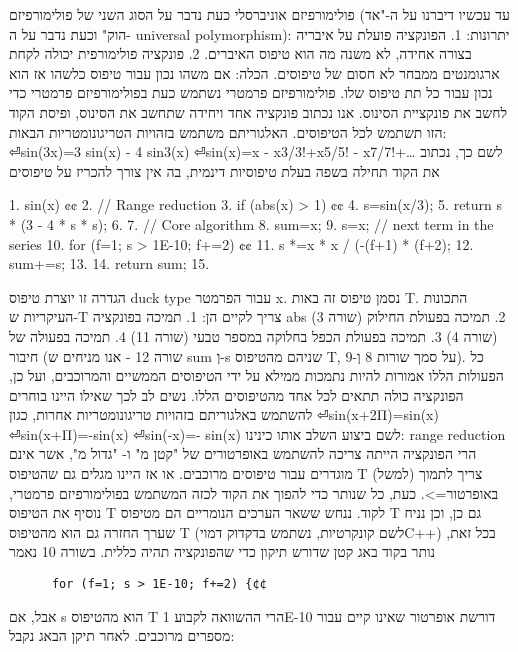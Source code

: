 \begin{טבלא}[!htbp]
      פולימורפיזם אוניברסלי
      כעת נדבר על הסוג השני של פולימורפיזם (עד עכשיו דיברנו על ה-"אד הוק" וכעת נדבר על ה- universal polymorphism):
      יתרונות:
      1. הפונקציה פועלת על איבריה בצורה אחידה, לא משנה מה הוא טיפוס האיברים.
      2. פונקציה פולימורפית יכולה לקחת ארגומנטים ממבחר לא חסום של טיפוסים.
      הכלה:
      אם משהו נכון עבור טיפוס כלשהו אז הוא נכון עבור כל תת טיפוס שלו.
      פולימורפיזם פרמטרי
      נשתמש כעת בפולימורפיזם פרמטרי כדי לחשב את פונקציית הסינוס. אנו נכתוב פונקציה אחד ויחידה שתחשב את הסינוס, ופיסת הקוד הזו תשתמש לכל הטיפוסים. האלגוריתם משתמש בזהויות הטריגונומטריות הבאות:
⏎sin(3x)=3 sin(x) - 4 sin3(x)
⏎sin(x)=x - x3/3!+x5/5! - x7/7!+…
      לשם כך, נכתוב את הקוד תחילה בשפה בעלת טיפוסיות דינמית, בה אין צורך להכריז על טיפוסים

      1. sin(x) {¢¢
        2. // Range reduction
        3. if (abs(x) > 1) {¢¢
          4. s=sin(x/3);
          5. return s * (3 - 4 * s * s);
        6. }
        7. // Core algorithm
        8. sum=x;
        9. s=x; // next term in the series
        10. for (f=1; s > 1E-10; f+=2) {¢¢
          11. s *=x * x / (-(f+1) * (f+2);
          12. sum+=s;
        13. }
        14. return sum;
      15. }

      הגדרה זו יוצרת טיפוס duck type עבור הפרמטר x. נסמן טיפוס זה באות T. התכונות העיקריות ש-T צריך לקיים הן:
      1. תמיכה בפונקציה abs (שורה 3)
      2. תמיכה בפעולת החילוק (שורה 4)
      3. תמיכה בפעולת הכפל בחלוקה במספר טבעי (שורה 11)
      4. תמיכה בפעולה של חיבור (שורה 12 - אנו מניחים ש sum וְ-s שניהם מהטיפוס T, על סמך שורות 8 וְ-9).
      כל הפעולות הללו אמורות להיות נתמכות ממילא על ידי הטיפוסים הממשיים והמרוכבים, ועל כן, הפונקציה כולה תתאים לכל אחד מהטיפוסים הללו.
      נשים לב לכך שאילו היינו בוחרים להשתמש באלגוריתם בזהויות טריגונומטריות אחרות, כגון
⏎sin(x+2Π)=sin(x)
⏎sin(x+Π)=-sin(x)
⏎sin(-x)=- sin(x)
      לשם ביצוע השלב אותו כינינו: range reduction הרי הפונקציה הייתה צריכה להשתמש באופרטורים של "קטן מ" ו- "גדול מ", אשר אינם מוגדרים עבור טיפוסים מרוכבים. או אז היינו מגלים גם שהטיפוס T צריך לתמוך (למשל) באופרטור=>.
      כעת, כל שנותר כדי להפוך את הקוד לכזה המשתמש בפולימורפיזם פרמטרי, נוסיף את הטיפוס T לקוד. ננחש ששאר הערכים הנומריים הם מטיפוס T גם כן, וכן נניח שערך החזרה גם הוא מהטיפוס T (לשם קונקרטיות, נשתמש בדקדוק דמויC++)
      בכל זאת, נותר בקוד באג קטן שדורש תיקון כדי שהפונקציה תהיה כללית. בשורה 10 נאמר
\begin{verbatim}
      for (f=1; s > 1E-10; f+=2) {¢¢
\end{verbatim}
        אבל, אם s הוא מהטיפוס T הרי ההשוואה לקבוע 1E-10 דורשת אופרטור שאינו קיים עבור מספרים מרוכבים. לאחר תיקן הבאג נקבל:


\end{טבלא}
